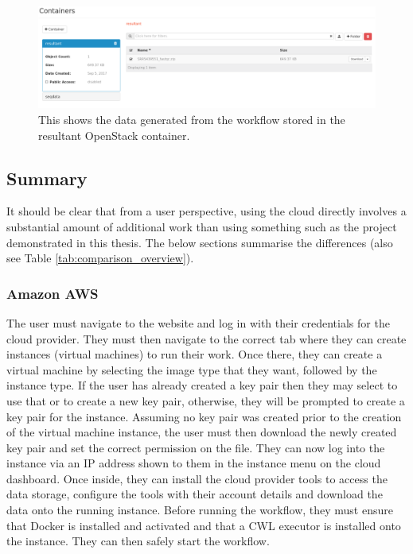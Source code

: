 \begin{figure}[h!]
\centering
\includegraphics[width=\textwidth]{Figures/4_os_swift_result.png}
\decoRule
\caption[OpenStack Swift Container with Result Data]{This shows the data generated from the workflow stored in the resultant OpenStack container.}
\label{fig:os_result}
\end{figure}

\subsection{Summary}

It should be clear that from a user perspective, using the cloud directly involves a substantial amount of additional work than using something such as the project demonstrated in this thesis. The below sections summarise the differences (also see Table \ref{tab:comparison_overview}).

\subsubsection{Amazon AWS}
The user must navigate to the website and log in with their credentials for the cloud provider. They must then navigate to the correct tab where they can create instances (virtual machines) to run their work. Once there, they can create a virtual machine by selecting the image type that they want, followed by the instance type. If the user has already created a key pair then they may select to use that or to create a new key pair, otherwise, they will be prompted to create a key pair for the instance. Assuming no key pair was created prior to the creation of the virtual machine instance, the user must then download the newly created key pair and set the correct permission on the file. They can now log into the instance via an IP address shown to them in the instance menu on the cloud dashboard. Once inside, they can install the cloud provider tools to access the data storage, configure the tools with their account details and download the data onto the running instance. Before running the workflow, they must ensure that Docker is installed and activated and that a CWL executor is installed onto the instance. They can then safely start the workflow.

